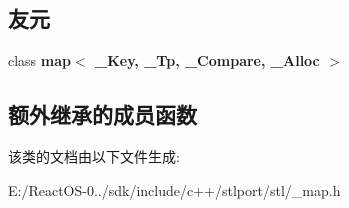 \subsection*{友元}
\begin{DoxyCompactItemize}
\item 
\mbox{\label{classmap_1_1value__compare_a69ae9b0f4fea440864015afd3d722c5c}} 
class {\bfseries map$<$ \+\_\+\+Key, \+\_\+\+Tp, \+\_\+\+Compare, \+\_\+\+Alloc $>$}
\end{DoxyCompactItemize}
\subsection*{额外继承的成员函数}


该类的文档由以下文件生成\+:\begin{DoxyCompactItemize}
\item 
E\+:/\+React\+O\+S-\/0../sdk/include/c++/stlport/stl/\+\_\+map.\+h\end{DoxyCompactItemize}
